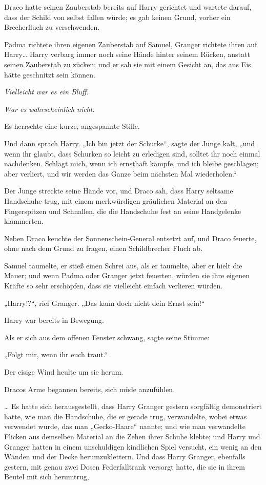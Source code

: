 {Draco hatte seinen Zauberstab bereits auf Harry gerichtet und wartete darauf, dass der Schild von selbst fallen würde; es gab keinen Grund, vorher ein Brecherfluch zu verschwenden.

Padma richtete ihren eigenen Zauberstab auf Samuel, Granger richtete ihren auf Harry… Harry verbarg immer noch seine Hände hinter seinem Rücken, anstatt seinen Zauberstab zu zücken; und er sah sie mit einem Gesicht an, das aus Eis hätte geschnitzt sein können.

\emph{Vielleicht war es ein Bluff.}

\emph{War es wahrscheinlich nicht.}

Es herrschte eine kurze, angespannte Stille.

Und dann sprach Harry. „Ich bin jetzt der Schurke“, sagte der Junge kalt, „und wenn ihr glaubt, dass Schurken so leicht zu erledigen sind, solltet ihr noch einmal nachdenken. Schlagt mich, wenn ich ernsthaft kämpfe, und ich bleibe geschlagen; aber verliert, und wir werden das Ganze beim nächsten Mal wiederholen.“

Der Junge streckte seine Hände vor, und Draco sah, dass Harry seltsame Handschuhe trug, mit einem merkwürdigen gräulichen Material an den Fingerspitzen und Schnallen, die die Handschuhe fest an seine Handgelenke klammerten.

Neben Draco keuchte der Sonnenschein-General entsetzt auf, und Draco feuerte, ohne nach dem Grund zu fragen, einen Schildbrecher Fluch ab.

Samuel taumelte, er stieß einen Schrei aus, als er taumelte, aber er hielt die Mauer; und wenn Padma oder Granger jetzt feuerten, würden sie ihre eigenen Kräfte so sehr erschöpfen, dass sie vielleicht einfach verlieren würden.

„Harry!?“, rief Granger. „Das kann doch nicht dein Ernst sein!“

Harry war bereits in Bewegung.

Als er sich aus dem offenen Fenster schwang, sagte seine Stimme:

„Folgt mir, wenn ihr euch traut.“

Der eisige Wind heulte um sie herum.

Dracos Arme begannen bereits, sich müde anzufühlen.

… Es hatte sich herausgestellt, dass Harry Granger gestern sorgfältig demonstriert hatte, wie man die Handschuhe, die er gerade trug, verwandelte, wobei etwas verwendet wurde, das man „Gecko-Haare“ nannte; und wie man verwandelte Flicken aus demselben Material an die Zehen ihrer Schuhe klebte; und Harry und Granger hatten in einem unschuldigen kindlichen Spiel versucht, ein wenig an den Wänden und der Decke herumzuklettern. Und dass Harry Granger, ebenfalls gestern, mit genau zwei Dosen Federfalltrank versorgt hatte, die sie in ihrem Beutel mit sich herumtrug,

}
